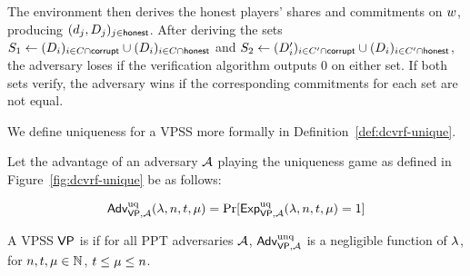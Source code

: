 The environment then derives the honest players' shares and commitments on $w$,
producing
$(d_j, D_j)_{j \in \mathsf{honest}}$.
After deriving the sets
$S_1 \gets ( D_i )_{i \in C \cap \mathsf{corrupt}} \cup ( D_i )_{i \in C \cap \mathsf{honest}}$
and $S_2 \gets ( D_i' )_{i \in C' \cap \mathsf{corrupt}} \cup ( D_i )_{i \in C' \cap \mathsf{honest}}$,
the adversary loses if the verification algorithm outputs 0 on either set.
%
If both sets verify,
the adversary wins if the corresponding commitments for each set are not equal.

We define uniqueness for a VPSS more formally in Definition~\ref{def:dcvrf-unique}.

\begin{definition} \label{def:dcvrf-unique}
Let the advantage of an adversary $\mathcal{A}$ playing the uniqueness game as defined in Figure~\ref{fig:dcvrf-unique} be as follows:

\[
  \textsf{\upshape Adv}^{\textrm{\upshape uq}}_{\mathsf{VP},\mathcal{A}}(\lambda, n, t, \mu)
  = \Pr[ \textsf{\upshape Exp}^{\textrm{\upshape uq}}_{\mathsf{VP},\mathcal{A}}(\lambda, n, t, \mu)= 1]
\]


  A VPSS $\mathsf{VP}$ is  if for all PPT adversaries $\mathcal{A}$,
  $\textsf{\upshape Adv}^{\textrm{\upshape unq}}_{\mathsf{VP},\mathcal{A}}$ is a negligible function of $\lambda$,
  for $n, t, \mu \in \mathbb{N}$,
  $t \leq \mu \leq n$.
\end{definition}




